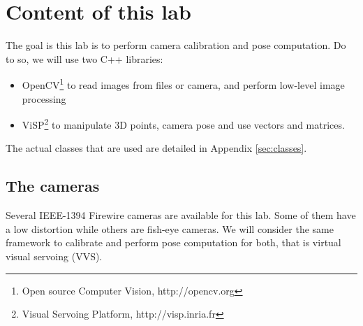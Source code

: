 \documentclass{ecnreport}
\begin{document}




\section{Content of this lab}

The goal is this lab is to perform camera calibration and pose computation. Do to so, we will use two C++ libraries:
\begin{itemize}
 \item OpenCV\footnote{Open source Computer Vision, http://opencv.org} to read images from files or camera, and perform low-level image processing
 \item ViSP\footnote{Visual Servoing Platform, http://visp.inria.fr} to manipulate 3D points, camera pose and use vectors and matrices.
\end{itemize}
The actual classes that are used are detailed in Appendix \ref{sec:classes}.\\

% 

\subsection{The cameras}

Several IEEE-1394 Firewire cameras are available for this lab. Some of them have a low distortion while others are fish-eye cameras. We will consider the 
same framework to calibrate and perform pose computation for both, that is virtual visual servoing (VVS).
\end{document}
